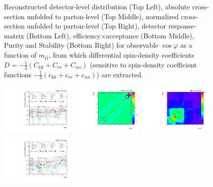 \begin{refsection}
\begin{figure}[htb]
\begin{center}
\caption{Reconstructed detector-level distribution (Top Left), absolute cross-section unfolded to parton-level (Top Middle), normalized cross-section unfolded to parton-level (Top Right), detector response-matrix (Bottom Left), efficiency$\times$acceptance (Bottom Middle), Purity and Stability (Bottom Right) for  observable $\cos\varphi$ as a function of $m_{t\bar{t}}$, from which differential spin-density coefficients $D = -\frac{1}{3}(C_{kk} + C_{rr} + C_{nn})$ (sensitive to spin-density coefficient functions $-\frac{1}{3}(c_{kk} + c_{rr} + c_{nn})$) are extracted.}
\label{fig:ll_cHel_mttbar}
\end{center}
\end{figure}
\clearpage
\begin{figure}[htb]
\begin{center}
 \includegraphics[width=0.32\textwidth]{fig_fullRun2UL/unfolding/combined/deltaSystCombinedlog_rebinnedB_ll_cHel_mttbar.pdf}
 \includegraphics[width=0.32\textwidth]{fig_fullRun2UL/unfolding/combined/StatCovMatrix_rebinnedB_ll_cHel_mttbar.pdf}
 \includegraphics[width=0.32\textwidth]{fig_fullRun2UL/unfolding/combined/TotalSystCovMatrix_rebinnedB_ll_cHel_mttbar.pdf} \\
 \includegraphics[width=0.32\textwidth]{fig_fullRun2UL/unfolding/combined/deltaSystCombinedlogNorm_rebinnedB_ll_cHel_mttbar.pdf}

\end{center}
\end{figure}
\end{refsection}
